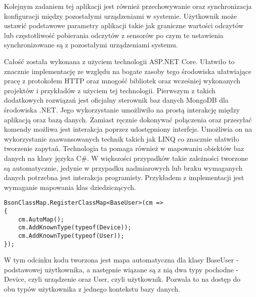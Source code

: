 Kolejnym zadaniem tej aplikacji jest również przechowywanie oraz synchronizacja konfiguracji
między pozostałymi urządzeniami w systemie. Użytkownik może ustawić podstawowe
parametry aplikacji takie jak graniczne wartości odczytów lub
częstotliwość pobierania odczytów z sensorów po czym te ustawienia
synchronizowane są z pozostałymi urządzeniami systemu.

Całość została wykonana z użyciem technologii ASP.NET Core.
Ułatwiło to znacznie implementację ze względu na bogate zasoby
tego środowiska ułatwiające pracę z protokołem HTTP oraz mnogość
bibliotek oraz wcześniej wykonanych projektów i przykładów z użyciem
tej technologii. 
Pierwszym z takich dodatkowych rozwiązań jest oficjalny sterownik
baz danych MongoDB dla środowiska .NET. Jego wykorzystanie 
umożliwiło na prostą interakcję między aplikacją oraz bazą
danych. Zamiast ręcznie dokonywać połączenia oraz przesyłać
komendy możliwa jest interakcja poprzez udostępniony interfejs.
Umożliwia on na wykorzystanie zaawansowanych technik takich jak
LINQ co znacznie ułatwiło tworzenie zapytań. Technologia ta
pomaga również w mapowaniu obiektów baz danych na klasy języka C\#.
W większości przypadków takie zależności tworzone są automatycznie,
jedynie w przypadku nadmiarowych lub braku wymaganych danych potrzebna
jest interakcja programisty. Przykładem z implementacji jest wymaganie
mapowania klas dziedziczących.
\begin{lstlisting}[language={[Sharp]C}]
BsonClassMap.RegisterClassMap<BaseUser>(cm =>
{
    cm.AutoMap();
    cm.AddKnownType(typeof(Device));
    cm.AddKnownType(typeof(User));
});
\end{lstlisting}
W tym odcinku kodu tworzona jest mapa automatyczna dla klasy BaseUser - podstawowej
użytkownika, a następnie wiązane są z nią dwa typy pochodne - Device, czyli urządzenie
oraz User, czyli użytkownik. Pozwala to na dostęp do obu typów użytkownika
z jednego kontekstu bazy danych.

